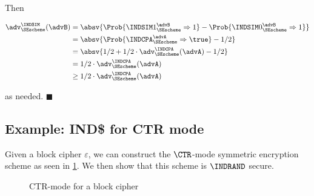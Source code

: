 Then

\begin{align*}
  \adv^{\INDSIM}_{\SEscheme}(\advB) &=
    \absv{\Prob{\INDSIM1^{\advB}_{\SEscheme} \Rightarrow 1} -
          \Prob{\INDSIM0^{\advB}_{\SEscheme} \Rightarrow 1}} \\
  &= \absv{\Prob{\INDCPA^{\advA}_{\SEscheme} \Rightarrow \true} - 1 / 2} \\
  &= \absv{1 / 2 + 1 / 2 \cdot \adv^{\INDCPA}_{\SEscheme}(\advA) - 1 / 2} \\
  &= 1 / 2 \cdot \adv^{\INDCPA}_{\SEscheme}(\advA) \\
  &\geq 1 / 2 \cdot \adv^{\INDCPA}_{\SEscheme}(\advA)
\end{align*}

as needed. $\blacksquare$


\subsection{Example: IND\$ for CTR mode}

Given a block cipher $\varepsilon$, we can construct the $\CTR$-mode
symmetric encryption scheme as seen in \cref{fig:ctr-mode}. We then show that
this scheme is $\INDRAND$ secure.

\begin{figure}[p]
	\centering
  \caption{CTR-mode for a block cipher}
  \label{fig:ctr-mode}
\end{figure}

